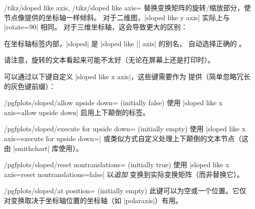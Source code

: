 \begin{pgfplotsxykeylist}{%
    /tikz/sloped like \x\space axis,%
    /tikz/sloped like \x\space axis=%
}
    替换变换矩阵的旋转/缩放部分，使节点像提供的坐标轴一样倾斜。
    对于二维图，|sloped like y axis| 实际上与 |rotate=90| 相同。
    对于三维坐标轴，这会导致更大的区别：
\pgfplotsexpensiveexample
\begin{codeexample}[]
\end{codeexample}

    在坐标轴标签内部，|sloped| 是 |sloped like || axis| 的别名，
    自动选择正确的 。

    请注意，旋转的文本看起来可能不太好（无论在屏幕上还是打印时）。

    可以通过以下键自定义 |sloped like x axis|，这些键需要作为
     提供（简单忽略冗长的灰色键前缀）：
    \begin{key}{/pgfplots/sloped/allow upside down= (initially false)}
        使用 |sloped like x axis=allow upside down| 启用上下颠倒的标签。
    \end{key}

    \begin{key}{/pgfplots/sloped/execute for upside down= (initially empty)}
        使用 |sloped like x axis={execute for upside down=\tikzset{anchor=north}}|
        或类似方式自定义处理上下颠倒的文本节点（这由 |smithchart| 库使用）。
    \end{key}

    \begin{key}{/pgfplots/sloped/reset nontranslations= (initially true)}
        使用 |sloped like x axis={reset nontranslations=false}| 以\emph{追加}
        变换到实际变换矩阵（而非替换它）。
    \end{key}

    \begin{key}{/pgfplots/sloped/at position= (initially empty)}
        此键可以为空或一个位置。它仅对变换取决于坐标轴位置的坐标轴（如
        |polaraxis|）有用。
    \end{key}
\end{pgfplotsxykeylist}


